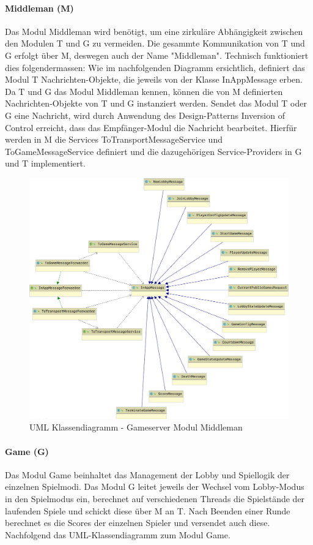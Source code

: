 \documentclass[11pt,ngerman]{article}
\begin{document}
    \paragraph{Middleman (M)}
	Das Modul Middleman wird benötigt, um eine zirkuläre Abhängigkeit zwischen den Modulen T und G zu vermeiden. Die gesammte Kommunikation von T und G erfolgt über M, deswegen auch der Name "Middleman". Technisch funktioniert dies folgendermassen: Wie im nachfolgenden Diagramm ersichtlich, definiert das Modul T Nachrichten-Objekte, die jeweils von der Klasse InAppMessage erben. Da T und G das Modul Middleman kennen, können die von M definierten Nachrichten-Objekte von T und G instanziert werden. Sendet das Modul T oder G eine Nachricht, wird durch Anwendung des Design-Patterns Inversion of Control erreicht, dass das Empfänger-Modul die Nachricht bearbeitet. Hierfür werden in M die Services ToTransportMessageService und ToGameMessageService definiert und die dazugehörigen Service-Providers in G und T implementiert.
	
	\begin{figure}[H]
    	\centering
    	\includegraphics[scale=0.2]{figures/gameserver-uml/middleman-classes.png}
    	\caption{UML Klassendiagramm - Gameserver Modul Middleman}
    	\label{fig:UMLModulMiddleman}
    \end{figure}

    \paragraph{Game (G)}
	Das Modul Game beinhaltet das Management der \Gls{Lobby} und Spiellogik der einzelnen Spielmodi. Das Modul G leitet jeweils der Wechsel vom \Gls{Lobby}-Modus in den Spielmodus ein, berechnet auf verschiedenen Threads die Spielstände der laufenden Spiele und schickt diese über M an T. Nach Beenden einer Runde berechnet es die Scores der einzelnen Spieler und versendet auch diese. Nachfolgend das UML-Klassendiagramm zum Modul Game.
\end{document}
